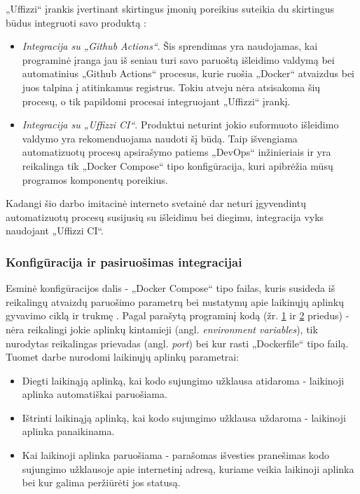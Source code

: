 \documentclass{VUMIFPSkursinis}
\begin{document}
„Uffizzi“ įrankis įvertinant skirtingus įmonių poreikius suteikia du skirtingus būdus integruoti savo produktą \cite{SaltKeturioliktas}:

\begin{itemize}
  \item \textit{Integracija su „Github Actions“}. Šis sprendimas yra naudojamas, kai programinė įranga jau iš seniau turi savo paruoštą išleidimo valdymą bei automatinius „Github Actions“ procesus, kurie ruošia „Docker“ atvaizdus bei juos talpina į atitinkamus registrus. Tokiu atveju nėra atsisakoma šių procesų, o tik papildomi procesai integruojant „Uffizzi“ įrankį.

  \item \textit{Integracija su „Uffizzi CI“}. Produktui neturint jokio suformuoto išleidimo valdymo yra rekomenduojama naudoti šį būdą. Taip išvengiama automatizuotų procesų apsirašymo patiems „DevOps“ inžinieriais ir yra reikalinga tik „Docker Compose“ tipo konfigūracija, kuri apibrėžia mūsų programos komponentų poreikius.


\end{itemize}
    
Kadangi šio darbo imitacinė interneto svetainė dar neturi įgyvendintų automatizuotų procesų susijusių su išleidimu bei diegimu, integracija vyks naudojant „Uffizzi CI“.
    \subsubsection{Konfigūracija ir pasiruošimas integracijai}

Esminė konfigūracijos dalis - „Docker Compose“ tipo failas, kuris susideda iš reikalingų atvaizdų paruošimo parametrų bei nustatymų apie laikinųjų aplinkų gyvavimo ciklą ir trukmę \cite{SaltKeturioliktas}. Pagal parašytą programinį kodą (žr. \hyperref[priedas1]{1} ir \hyperref[priedas2]{2} priedus) - nėra reikalingi jokie aplinkų kintamieji (angl. \textit{environment variables}), tik nurodytas reikalingas prievadas (angl. \textit{port}) bei kur rasti „Dockerfile“ tipo failą. Tuomet darbe nurodomi laikinųjų aplinkų parametrai:

\begin{itemize}
  \item Diegti laikinąją aplinką, kai kodo sujungimo užklausa atidaroma - laikinoji aplinka automatiškai paruošiama.

  \item Ištrinti laikinąją aplinką, kai kodo sujungimo užklausa uždaroma - laikinoji aplinka panaikinama.

  \item Kai laikinoji aplinka paruošiama - parašomas išvesties pranešimas kodo sujungimo užklausoje apie internetinį adresą, kuriame veikia laikinoji aplinka bei kur galima peržiūrėti jos statusą.
  
\end{itemize}
\end{document}
